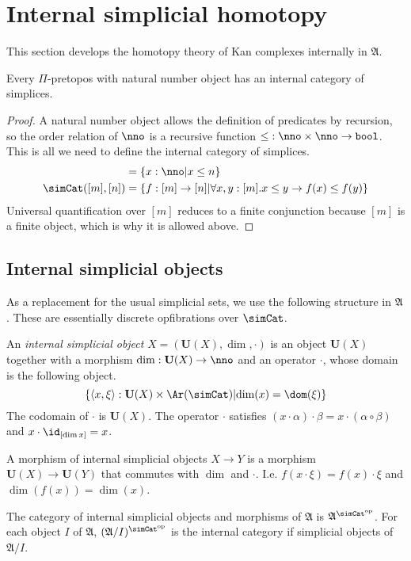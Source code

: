 \documentclass{tac}
\newcommand\hide[1]{}
\newcommand\set[1]{\left\{#1\right\}}
\newcommand\dual{^{\mathrm{op}}}
\newcommand\s{^{\simCat\dual}}
\newcommand\of{:}
\newcommand\tuplet[1]{\left\langle #1 \right\rangle}
\newcommand\bool{\mathtt{bool}}
\newcommand\ambient{\mathfrak A}
\begin{document}
\section{Internal simplicial homotopy}
This section develops the homotopy theory of Kan complexes internally in $\ambient$.

\begin{proposition} Every $\Pi$-pretopos with natural number object has an internal category of simplices.\end{proposition}

\begin{proof} A natural number object allows the definition of predicates by recursion, so the order relation of $\nno$ is a recursive function $\mathord\leq\of\nno\times \nno \to \bool$. This is all we need to define the internal category of simplices.
\begin{align*}
[n] &= \set{x\of\nno\middle| x\leq n}\\
\simCat([m],[n]) &= \set{f\of[m]\to[n]\middle|\forall x,y\of [m].x\leq y\to f(x)\leq f(y)}
\end{align*}
Universal quantification over $[m]$ reduces to a finite conjunction because $[m]$ is a finite object, which is why it is allowed above. 
\end{proof}

\subsection{Internal simplicial objects}%
As a replacement for the usual simplicial sets, we use the following structure in $\ambient$. These are essentially discrete opfibrations over $\simCat$.

\newcommand\base[1]{\mathbf{U}\!\left(#1\right)}
\begin{definition} An \emph{internal simplicial object} $X=(\base X,\dim,\cdot)$ is an object $\base X$ together with a morphism $\dim\of \base X\to\nno$ and an operator $\cdot$, whose domain is the following object.
\[ \set{\tuplet{x,\xi}\of \base X\times\Ar(\simCat)\middle| \dim (x)=\dom(\xi)} \]
The codomain of $\cdot$ is $\base X$. The operator $\cdot$ satisfies $(x\cdot\alpha)\cdot\beta=x\cdot(\alpha\circ\beta)$ and $x\cdot\id_{[\dim x]}=x$.  

A morphism of internal simplicial objects $X\to Y$ is a morphism $\base X\to \base Y$ that commutes with $\dim$ and $\cdot$. I.e. $f(x\cdot \xi)=f(x)\cdot\xi$ and $\dim(f(x))=\dim(x)$.

The category of internal simplicial objects and morphisms of $\ambient$ is $\ambient\s$. For each object $I$ of $\ambient$, $(\ambient/I)\s$ is the internal category if simplicial objects of $\ambient/I$.
\end{definition}\hide{ Is it feasible to rewrite the whole paper with these?}
\end{document}

